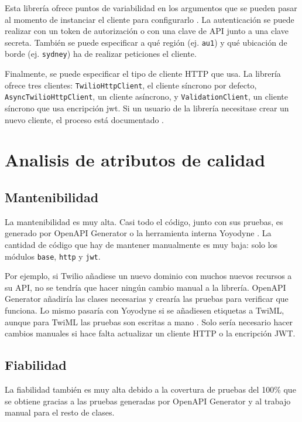 \documentclass{article}
\begin{document}
\hfill

Esta librería ofrece puntos de variabilidad
en los argumentos que se pueden pasar
al momento de instanciar el cliente para configurarlo
\cite{readme}.
La autenticación se puede realizar con un token de autorización o
con una clave de API junto a una clave secreta.
También se puede especificar a qué región (ej. \verb|au1|)
y qué ubicación de borde (ej. \verb|sydney|)
ha de realizar peticiones el cliente.

Finalmente, se puede especificar el tipo de cliente HTTP que usa.
La librería ofrece tres clientes:
\verb|TwilioHttpClient|, el cliente síncrono por defecto,
\verb|AsyncTwilioHttpClient|, un cliente asíncrono, y
\verb|ValidationClient|, un cliente síncrono que usa encripción jwt.
Si un usuario de la librería necesitase crear un nuevo cliente,
el proceso está documentado
\cite{crear-cliente-http}.

\section{Analisis de atributos de calidad}

\subsection{Mantenibilidad}

La mantenibilidad es muy alta.
Casi todo el código, junto con sus pruebas,
es generado por OpenAPI Generator
\cite{twilio-generated-openapi}
o la herramienta interna Yoyodyne
\cite{twilio-generated-yoyodyne}.
La cantidad de código que hay de mantener manualmente es muy baja:
solo los módulos \verb|base|, \verb|http| y \verb|jwt|.

Por ejemplo,
si Twilio añadiese un nuevo dominio con muchos nuevos recursos a su API,
no se tendría que hacer ningún cambio manual a la librería.
OpenAPI Generator añadiría las clases necesarias
y crearía las pruebas para verificar que funciona.
Lo mismo pasaría con Yoyodyne si se añadiesen etiquetas a TwiML,
aunque para TwiML las pruebas son escritas a mano
\cite{twilio-twiml-manual-tests}.
Solo sería necesario hacer cambios manuales si hace falta actualizar
un cliente HTTP o la encripción JWT.


\subsection{Fiabilidad}

La fiabilidad también es muy alta
debido a la covertura de pruebas del 100\%
que se obtiene gracias a las pruebas generadas por OpenAPI Generator
y al trabajo manual para el resto de clases.
\end{document}
